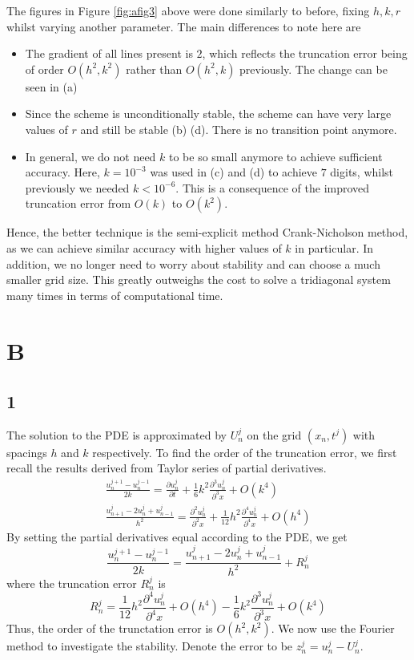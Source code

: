 \documentclass{article}
\numberwithin{equation}{section}
\theoremstyle{definition}
\newcommand{\pp}[2]{\frac{\partial #1}{\partial #2}}
\newcommand{\ppn}[3]{\frac{\partial^{#1} #2}{\partial^{#1} #3}}
\begin{document}
The figures in Figure \ref{fig:afig3} above were done similarly to before, fixing $h,k,r$ whilst varying another parameter. The main differences to note here are
\begin{itemize}
    \item The gradient of all lines present is $2$, which reflects the truncation error being of order $O(h^2,k^2)$ rather than $O(h^2, k)$ previously. The change can be seen in (a)
    \item Since the scheme is unconditionally stable, the scheme can have very large values of $r$ and still be stable (b) (d). There is no transition point anymore.
    \item In general, we do not need $k$ to be so small anymore to achieve sufficient accuracy. Here, $k = 10^{-3}$ was used in (c) and (d) to achieve $7$ digits, whilst previously we needed $k < 10^{-6}$. This is a consequence of the improved truncation error from $O(k)$ to $O(k^2)$.
\end{itemize}

Hence, the better technique is the semi-explicit method Crank-Nicholson method, as we can achieve similar accuracy with higher values of $k$ in particular. In addition, we no longer need to worry about stability and can choose a much smaller grid size. This greatly outweighs the cost to solve a tridiagonal system many times in terms of computational time.

\section{B}
\subsection{1}
The solution to the PDE is approximated by $U_n^j$ on the grid $(x_n, t^j)$ with spacings $h$ and $k$ respectively. To find the order of the truncation error, we first recall the results derived from Taylor series of partial derivatives.
\begin{align}
    \label{eq:btaylor}
    \frac{u_n^{j+1} - u_n^{j-1}}{2k} = \pp{u_n^j}{t} +\frac 16 k^2 \ppn{3}{u_n^j}{x} + O(k^4)\\
    \frac{u_{n+1}^j - 2u_n^j + u_{n-1}^j}{h^2} = \ppn{2}{u_n^j}{x} + \frac{1}{12} h^2 \ppn{4}{u_n^j}{x} + O(h^4)
\end{align}
By setting the partial derivatives equal according to the PDE, we get
\begin{equation}
    \label{eq:bundiscretised}
    \frac{u_n^{j+1} - u_n^{j-1}}{2k} = \frac{u_{n+1}^j - 2u_n^j + u_{n-1}^j}{h^2}  +R_n^j
\end{equation}
where the truncation error $R_n^j$ is
\begin{equation}
    \label{eq:btrunc}
    R_n^j = \frac{1}{12} h^2 \ppn{4}{u_n^j}{x} + O(h^4) - \frac 16 k^2 \ppn{3}{u_n^j}{x} + O(k^4)
\end{equation}
Thus, the order of the trunctation error is $O(h^2, k^2)$. We now use the Fourier method to investigate the stability. Denote the error to be $z_n^j = u_n^j - U_n^j$.
\end{document}
